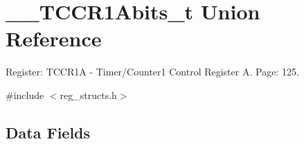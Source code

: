 \hypertarget{union_____t_c_c_r1_abits__t}{\section{\+\_\+\+\_\+\+T\+C\+C\+R1\+Abits\+\_\+t Union Reference}
\label{union_____t_c_c_r1_abits__t}
}


Register\+: T\+C\+C\+R1\+A -\/ Timer/\+Counter1 Control Register A. Page\+: 125.  




{\ttfamily \#include $<$reg\+\_\+structs.\+h$>$}

\subsection*{Data Fields}
